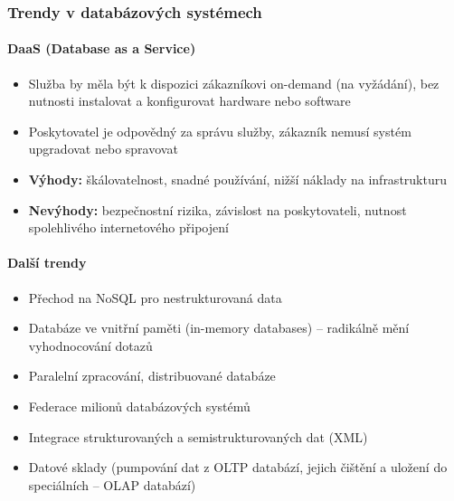 \documentclass[12pt,a4paper]{article}
\begin{document}
\subsubsection{Trendy v databázových systémech}

\paragraph{DaaS (Database as a Service)}
\begin{itemize}
  \item Služba by měla být k dispozici zákazníkovi on-demand (na vyžádání), bez nutnosti instalovat
    a konfigurovat hardware nebo software
  \item Poskytovatel je odpovědný za správu služby, zákazník nemusí systém upgradovat nebo spravovat
  \item \textbf{Výhody:} škálovatelnost, snadné používání, nižší náklady na infrastrukturu
  \item \textbf{Nevýhody:} bezpečnostní rizika, závislost na poskytovateli, nutnost spolehlivého
    internetového připojení
\end{itemize}

\paragraph{Další trendy}
\begin{itemize}
  \item Přechod na NoSQL pro nestrukturovaná data
  \item Databáze ve vnitřní paměti (in-memory databases) -- radikálně mění vyhodnocování dotazů
  \item Paralelní zpracování, distribuované databáze
  \item Federace milionů databázových systémů
  \item Integrace strukturovaných a semistrukturovaných dat (XML)
  \item Datové sklady (pumpování dat z OLTP databází, jejich čištění a uložení do speciálních --
    OLAP databází)
\end{itemize}
\end{document}
